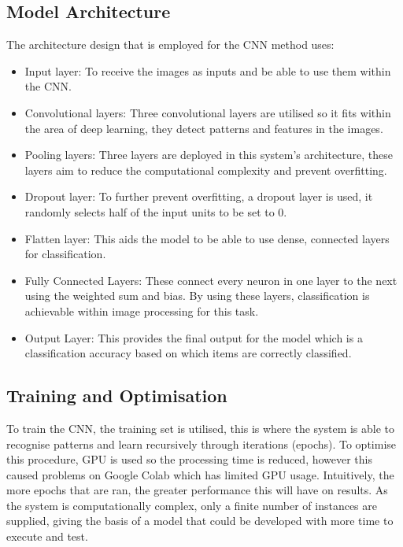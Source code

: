 \documentclass[conference]{IEEEtran}
\begin{document}
\subsection{Model Architecture}
The architecture design that is employed for the CNN method uses:
\begin{itemize}
    \item Input layer: To receive the images as inputs and be able to use them within the CNN.
    \item Convolutional layers: Three convolutional layers are utilised so it fits within the area of deep learning, they detect patterns and features in the images.
    \item Pooling layers: Three layers are deployed in this system’s architecture, these layers aim to reduce the computational complexity and prevent overfitting.
    \item Dropout layer: To further prevent overfitting, a dropout layer is used, it randomly selects half of the input units to be set to 0.
    \item Flatten layer: This aids the model to be able to use dense, connected layers for classification.
    \item Fully Connected Layers: These connect every neuron in one layer to the next using the weighted sum and bias. By using these layers, classification is achievable within image processing for this task.
    \item Output Layer: This provides the final output for the model which is a classification accuracy based on which items are correctly classified.
\end{itemize}

\subsection{Training and Optimisation}
To train the CNN, the training set is utilised, this is where the system is able to recognise patterns and learn recursively through iterations (epochs). To optimise this procedure, GPU is used so the processing time is reduced, however this caused problems on Google Colab which has limited GPU usage. Intuitively, the more epochs that are ran, the greater performance this will have on results. As the system is computationally complex, only a finite number of instances are supplied, giving the basis of a model that could be developed with more time to execute and test. 
\end{document}

